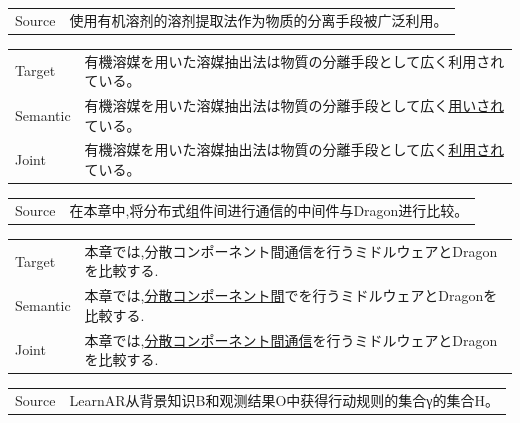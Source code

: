 \vspace{0.4cm}
\begin{table}[h]
    \centering
    \begin{CJK}{UTF8}{gbsn}
        \begin{tabularx}{\textwidth}{p{1.2cm}b}\toprule
            Source & 使用有机溶剂的溶剂提取法作为物质的分离手段被广泛利用。 \\
        \end{tabularx}
    \end{CJK}

    \begin{CJK}{UTF8}{ipxm}
        \begin{tabularx}{\textwidth}{p{1.2cm}b}
            Target & 有機溶媒を用いた溶媒抽出法は物質の分離手段として広く利用されている。 \\
            Semantic & 有機溶媒を用いた溶媒抽出法は物質の分離手段として広く\underline{用いされ}ている。 \\
            Joint & 有機溶媒を用いた溶媒抽出法は物質の分離手段として広く\underline{利用され}ている。 \\\midrule
        \end{tabularx}
    \end{CJK}

    \begin{CJK}{UTF8}{gbsn}
        \begin{tabularx}{\textwidth}{p{1.2cm}b}
            Source & 在本章中,将分布式组件间进行通信的中间件与Dragon进行比较。 \\
        \end{tabularx}
    \end{CJK}

    \begin{CJK}{UTF8}{ipxm}
        \begin{tabularx}{\textwidth}{p{1.2cm}b}
            Target & 本章では,分散コンポーネント間通信を行うミドルウェアとDragonを比較する. \\
            Semantic & 本章では,\underline{分散コンポーネント間}でを行うミドルウェアとDragonを比較する. \\
            Joint & 本章では,\underline{分散コンポーネント間通信}を行うミドルウェアとDragonを比較する. \\\midrule
        \end{tabularx}
    \end{CJK}

    \begin{CJK}{UTF8}{gbsn}
        \begin{tabularx}{\textwidth}{p{1.2cm}b}
            Source & LearnAR从背景知识B和观测结果O中获得行动规则的集合γ的集合H。 \\
        \end{tabularx}
    \end{CJK}


\end{table}
